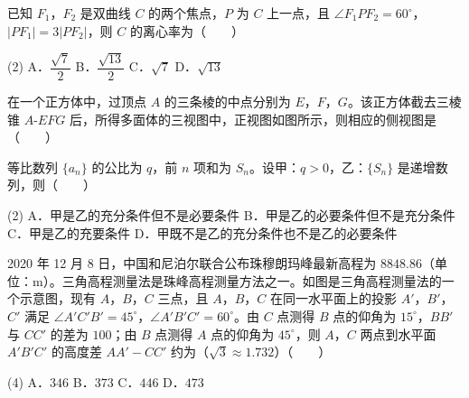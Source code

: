 \begin{question}
已知 $F_1$，$F_2$ 是双曲线 $C$ 的两个焦点，$P$ 为 $C$ 上一点，且 $\angle F_1PF_2=60^\circ$，$|PF_1|=3|PF_2|$，则 $C$ 的离心率为\mbox{（　　）}

\begin{gkopts}(2)
\task A．$\dfrac{\sqrt7}{2}$
\task B．$\dfrac{\sqrt{13}}2$
\task C．$\sqrt7$
\task D．$\sqrt{13}$
\end{gkopts}

\Needspace{0.4\textheight}
\end{question}
\begin{question}
在一个正方体中，过顶点 $A$ 的三条棱的中点分别为 $E$，$F$，$G$。该正方体截去三棱锥 $A\text{-}EFG$ 后，所得多面体的三视图中，正视图如图所示，则相应的侧视图是\mbox{（　　）}
\nopagebreak[4]
\begin{center}\end{center}
\nopagebreak[4]
\end{question}
\begin{question}
等比数列 $\{a_n\}$ 的公比为 $q$，前 $n$ 项和为 $S_n$。设甲：$q>0$，乙：$\{S_n\}$ 是递增数列，则\mbox{（　　）}

\begin{gkopts}(2)
\task A．甲是乙的充分条件但不是必要条件
\task B．甲是乙的必要条件但不是充分条件
\task C．甲是乙的充要条件
\task D．甲既不是乙的充分条件也不是乙的必要条件
\end{gkopts}

\Needspace{0.4\textheight}
\end{question}
\begin{question}
2020 年 12 月 8 日，中国和尼泊尔联合公布珠穆朗玛峰最新高程为 $8848.86$（单位：m）。三角高程测量法是珠峰高程测量方法之一。如图是三角高程测量法的一个示意图，现有 $A$，$B$，$C$ 三点，且 $A$，$B$，$C$ 在同一水平面上的投影 $A'$，$B'$，$C'$ 满足 $\angle A'C'B'=45^\circ$，$\angle A'B'C'=60^\circ$。由 $C$ 点测得 $B$ 点的仰角为 $15^\circ$，$BB'$ 与 $CC'$ 的差为 $100$；由 $B$ 点测得 $A$ 点的仰角为 $45^\circ$，则 $A$，$C$ 两点到水平面 $A'B'C'$ 的高度差 $AA'-CC'$ 约为（$\sqrt3\approx1.732$）\mbox{（　　）}
\nopagebreak[4]
\begin{center}\end{center}
\nopagebreak[4]
\begin{gkopts}(4)
\task A．$346$
\task B．$373$
\task C．$446$
\task D．$473$
\end{gkopts}

\end{question}
